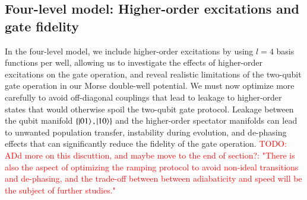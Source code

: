\documentclass{subfiles}
\begin{document}
\subsection{Four-level model: Higher-order excitations and gate fidelity}
In the four-level model, we include higher-order excitations by using $l=4$ basis functions per well, allowing us to investigate the effects of higher-order excitations on the gate operation, and reveal realistic limitations of the two-qubit gate operation in our Morse double-well potential. We must now optimize more carefully to avoid off-diagonal couplings that lead to leakage to higher-order states that would otherwise spoil the two-qubit gate protocol. Leakage between the qubit manifold $\{\ket{01}, \ket{10}\}$ and the higher-order spectator manifolds can lead to unwanted population transfer, instability during evolution, and de-phasing effects that can significantly reduce the fidelity of the gate
operation. \textcolor{red}{TODO: ADd more on this discuttion, and maybe move to the end of section?: "There is also the aspect of optimizing the ramping protocol to avoid non-ideal transitions and de-phasing, and the trade-off between between adiabaticity and speed will be the subject of further studies." }
\end{document}
